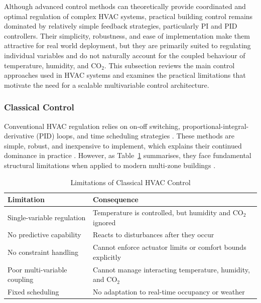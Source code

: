 \documentclass[12pt, a4paper]{article}
\begin{document}
	Although advanced control methods can theoretically provide coordinated and optimal regulation of complex HVAC systems, practical building control remains dominated by relatively simple feedback strategies, particularly PI and PID controllers. Their simplicity, robustness, and ease of implementation make them attractive for real world deployment, but they are primarily suited to regulating individual variables and do not naturally account for the coupled behaviour of temperature, humidity, and CO$_2$. This subsection reviews the main control approaches used in HVAC systems and examines the practical limitations that motivate the need for a scalable multivariable control architecture.
	
	\subsubsection{Classical Control}
	
	Conventional HVAC regulation relies on on-off switching, proportional-integral-derivative (PID) loops, and time scheduling strategies \citep{harroldAutomaticControlsBuilding1988}. These methods are simple, robust, and inexpensive to implement, which explains their continued dominance in practice \citep{naiduAdvancedControlStrategies2011}. However, as Table~\ref{tab:classical_limits} summarises, they face fundamental structural limitations when applied to modern multi-zone buildings \citep{balaliEnergyModellingControl2023}.
	
	\begin{table}[h]
		\centering
		\caption{Limitations of Classical HVAC Control}
		\label{tab:classical_limits}
		\begin{tabular}{lp{8cm}}
			\toprule
			\textbf{Limitation} & \textbf{Consequence} \\
			\midrule
			Single-variable regulation & Temperature is controlled, but humidity and CO$_2$ ignored \\
			No predictive capability & Reacts to disturbances after they occur \\
			No constraint handling & Cannot enforce actuator limits or comfort bounds explicitly \\
			Poor multi-variable coupling & Cannot manage interacting temperature, humidity, and CO$_2$ \\
			Fixed scheduling & No adaptation to real-time occupancy or weather \\
			\bottomrule
		\end{tabular}
	\end{table}
	
\end{document}
